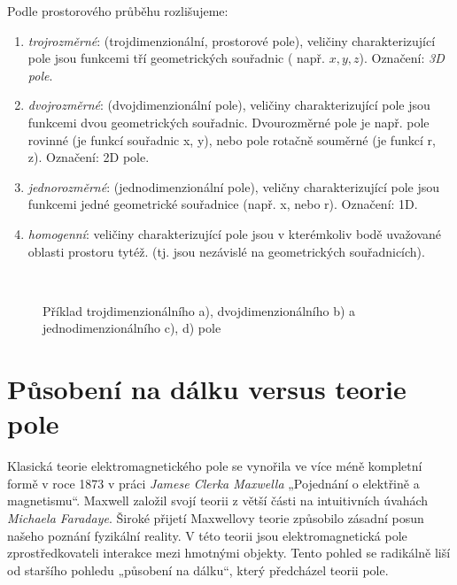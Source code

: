     Podle prostorového průběhu rozlišujeme:
    \begin{enumerate}[noitemsep]
      \item \emph{trojrozměrné}: (trojdimenzionální, prostorové pole), veličiny
            charakterizující pole jsou funkcemi tří geometrických souřadnic ( např. $x, y, z$).
            Označení: \emph{3D pole}.
      \item \emph{dvojrozměrné}: (dvojdimenzionální pole), veličiny charakterizující pole jsou
            funkcemi dvou  geometrických souřadnic. Dvourozměrné pole je např. pole rovinné (je
            funkcí souřadnic x, y), nebo pole rotačně souměrné (je funkcí r, z). Označení: 2D
            pole.
      \item \emph{jednorozměrné}: (jednodimenzionální pole), veličny charakterizující pole jsou
            funkcemi jedné geometrické souřadnice (např. x, nebo r). Označení: 1D.
      \item \emph{homogenní}: veličiny charakterizující pole jsou v kterémkoliv bodě uvažované
            oblasti prostoru tytéž. (tj. jsou nezávislé na geometrických souřadnicích).
    \end{enumerate}      
    \begin{figure}[ht!]
      \centering
        {}          \hspace{1em}            
        {}                      \\
        {}          \hspace{1em}              
        {}                       
      \caption{Příklad trojdimenzionálního a), dvojdimenzionálního b) a jednodimenzionálního c), 
               d) pole}
      \label{fyz:fig221}
    \end{figure} 
         
  \section{Působení na dálku versus teorie pole}
    Klasická teorie elektromagnetického pole se vynořila ve více méně kompletní formě v roce 1873 v 
    práci \emph{Jamese Clerka Maxwella} „Pojednání o elektřině a magnetismu“. Maxwell založil svojí 
    teorii z větší části na intuitivních úvahách \emph{Michaela Faradaye}. Široké přijetí 
    Maxwellovy teorie způsobilo zásadní posun našeho poznání fyzikální reality. V této teorii jsou 
    elektromagnetická pole zprostředkovateli interakce mezi hmotnými objekty. Tento pohled se 
    radikálně liší od staršího pohledu „působení na dálku“, který předcházel teorii pole.
  
